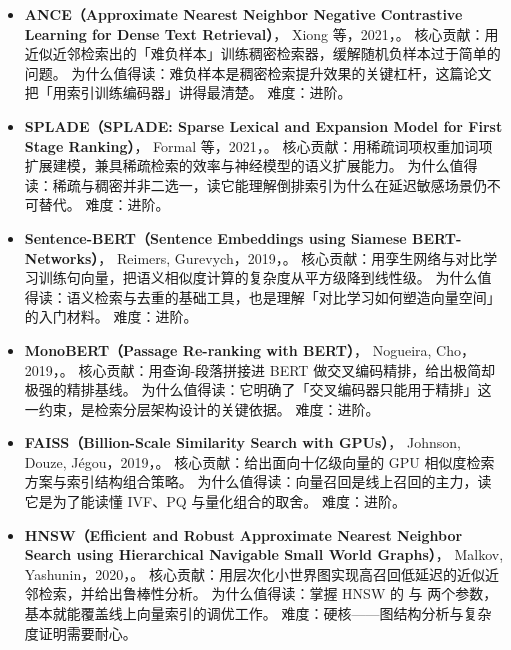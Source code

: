 \begin{itemize}
        核心贡献：用「延迟交互」把查询与文档的 token 级匹配推迟到检索阶段，兼顾效果与效率。
        为什么值得读：它给出了双塔表达力与交叉编码器精度之间的第三条路，是多向量检索的思想源头。
        难度：进阶。
  \item \textbf{ANCE（Approximate Nearest Neighbor Negative Contrastive Learning for Dense Text Retrieval）}，
        Xiong 等，2021，\cite{xiong2020ance}。
        核心贡献：用近似近邻检索出的「难负样本」训练稠密检索器，缓解随机负样本过于简单的问题。
        为什么值得读：难负样本是稠密检索提升效果的关键杠杆，这篇论文把「用索引训练编码器」讲得最清楚。
        难度：进阶。
  \item \textbf{SPLADE（SPLADE: Sparse Lexical and Expansion Model for First Stage Ranking）}，
        Formal 等，2021，\cite{formal2021splade}。
        核心贡献：用稀疏词项权重加词项扩展建模，兼具稀疏检索的效率与神经模型的语义扩展能力。
        为什么值得读：稀疏与稠密并非二选一，读它能理解倒排索引为什么在延迟敏感场景仍不可替代。
        难度：进阶。
  \item \textbf{Sentence-BERT（Sentence Embeddings using Siamese BERT-Networks）}，
        Reimers, Gurevych，2019，\cite{reimers2019sbert}。
        核心贡献：用孪生网络与对比学习训练句向量，把语义相似度计算的复杂度从平方级降到线性级。
        为什么值得读：语义检索与去重的基础工具，也是理解「对比学习如何塑造向量空间」的入门材料。
        难度：进阶。
  \item \textbf{MonoBERT（Passage Re-ranking with BERT）}，
        Nogueira, Cho，2019，\cite{nogueira2019monobert}。
        核心贡献：用查询-段落拼接进 BERT 做交叉编码精排，给出极简却极强的精排基线。
        为什么值得读：它明确了「交叉编码器只能用于精排」这一约束，是检索分层架构设计的关键依据。
        难度：进阶。
  \item \textbf{FAISS（Billion-Scale Similarity Search with GPUs）}，
        Johnson, Douze, J\'egou，2019，\cite{johnson2019faiss}。
        核心贡献：给出面向十亿级向量的 GPU 相似度检索方案与索引结构组合策略。
        为什么值得读：向量召回是线上召回的主力，读它是为了能读懂 IVF、PQ 与量化组合的取舍。
        难度：进阶。
  \item \textbf{HNSW（Efficient and Robust Approximate Nearest Neighbor Search using Hierarchical Navigable Small World Graphs）}，
        Malkov, Yashunin，2020，\cite{malkov2020hnsw}。
        核心贡献：用层次化小世界图实现高召回低延迟的近似近邻检索，并给出鲁棒性分析。
        为什么值得读：掌握 HNSW 的  与  两个参数，基本就能覆盖线上向量索引的调优工作。
        难度：硬核——图结构分析与复杂度证明需要耐心。
\end{itemize}

